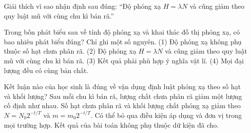 \begin{bt}
Giải thích vì sao nhận định sau đúng: “Độ phóng xạ $H=\lambda N$ và cũng giảm theo quy luật mũ với cùng chu kì bán rã.”
\end{bt}

\begin{ex}
Trong bốn phát biểu sau về tính độ phóng xạ và khai thác đồ thị phóng xạ, có bao nhiêu phát biểu đúng? Chỉ ghi một số nguyên. (1) Độ phóng xạ không phụ thuộc số hạt chưa phân rã. (2) Độ phóng xạ $H=\lambda N$ và cũng giảm theo quy luật mũ với cùng chu kì bán rã. (3) Kết quả phải phù hợp ý nghĩa vật lí. (4) Mọi đại lượng đều có cùng bản chất.
\end{ex}

\begin{ex}
Kết luận nào của học sinh là đúng về vận dụng định luật phóng xạ theo số hạt và khối lượng?
\choice
{Sau mỗi chu kì bán rã, lượng chất chưa phân rã giảm một lượng cố định như nhau.}
{\True Số hạt chưa phân rã và khối lượng chất phóng xạ giảm theo $N=N_0 2^{-t/T}$ và $m=m_0 2^{-t/T}$.}
{Có thể bỏ qua điều kiện áp dụng và đơn vị trong mọi trường hợp.}
{Kết quả của bài toán không phụ thuộc dữ kiện đã cho.}
\end{ex}

